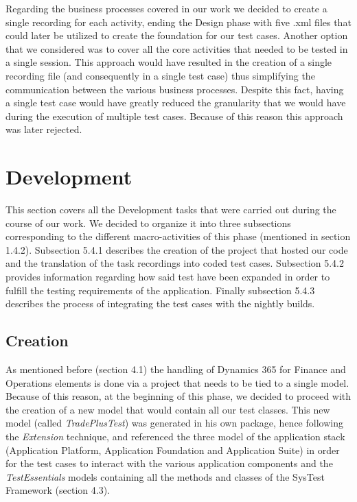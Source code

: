 Regarding the business processes covered in our work we decided to create a single recording for each activity, ending the Design phase with five .xml files that could later be utilized to create the foundation for our test cases. Another option that we considered was to cover all the core activities that needed to be tested in a single session. This approach would have resulted in the creation of a single recording file (and consequently in a single test case) thus simplifying the communication between the various business processes. Despite this fact, having a single test case would have greatly reduced the granularity that we would have during the execution of multiple test cases. Because of this reason this approach was later rejected.


\section{Development} 

This section covers all the Development tasks that were carried out during the course of our work. We decided to organize it into three subsections corresponding to the different macro-activities of this phase (mentioned in section 1.4.2). Subsection 5.4.1 describes the creation of the project that hosted our code and the translation of the task recordings into coded test cases. Subsection 5.4.2 provides information regarding how said test have been expanded in order to fulfill the testing requirements of the application. Finally subsection 5.4.3 describes the process of integrating the test cases with the nightly builds.

\subsection{Creation}

As mentioned before (section 4.1) the handling of Dynamics 365 for Finance and Operations elements is done via a project that needs to be tied to a single model. Because of this reason, at the beginning of this phase, we decided to proceed with the creation of a new model that would contain all our test classes. This new model (called \textit{TradePlusTest}) was generated in his own package, hence following the \textit{Extension} technique, and referenced the three model of the application stack (Application Platform, Application Foundation and Application Suite) in order for the test cases to interact with the various application components and the \textit{TestEssentials} models containing all the methods and classes of the SysTest Framework (section 4.3).

